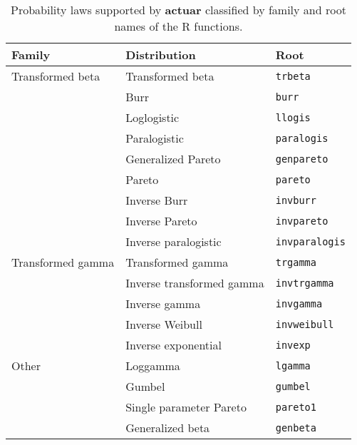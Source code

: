 \documentclass[x11names]{article}
\newcommand{\proglang}[1]{\textsf{#1}}
\newcommand{\pkg}[1]{\textbf{#1}}
\newcommand{\code}[1]{\texttt{#1}}
\begin{document}
\begin{table}
  \centering
  \begin{tabular}{lll}
    \toprule
    Family & Distribution & Root \\
    \midrule
    Transformed beta  & Transformed beta & \code{trbeta} \\
                      & Burr & \code{burr} \\
                      & Loglogistic & \code{llogis} \\
                      & Paralogistic & \code{paralogis} \\
                      & Generalized Pareto & \code{genpareto} \\
                      & Pareto & \code{pareto} \\
                      & Inverse Burr & \code{invburr} \\
                      & Inverse Pareto & \code{invpareto} \\
                      & Inverse paralogistic & \code{invparalogis} \\
    \midrule
    Transformed gamma & Transformed gamma & \code{trgamma} \\
                      & Inverse transformed gamma & \code{invtrgamma} \\
                      & Inverse gamma & \code{invgamma} \\
                      & Inverse Weibull & \code{invweibull} \\
                      & Inverse exponential & \code{invexp} \\
    \midrule
    Other             & Loggamma & \code{lgamma} \\
                      & Gumbel & \code{gumbel} \\
                      & Single parameter Pareto & \code{pareto1} \\
                      & Generalized beta & \code{genbeta} \\
    \bottomrule
  \end{tabular}
  \caption{Probability laws supported by \pkg{actuar} classified by
    family and root names of the \proglang{R} functions.}
  \label{tab:continuous}
\end{table}
\end{document}
